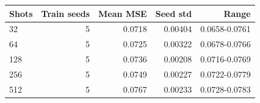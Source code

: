 \begin{tabular}{lrrrr}
\toprule
Shots & Train seeds & Mean MSE & Seed std & Range \\
\midrule
32 & 5 & 0.0718 & 0.00404 & 0.0658-0.0761 \\
64 & 5 & 0.0725 & 0.00322 & 0.0678-0.0766 \\
128 & 5 & 0.0736 & 0.00208 & 0.0716-0.0769 \\
256 & 5 & 0.0749 & 0.00227 & 0.0722-0.0779 \\
512 & 5 & 0.0767 & 0.00233 & 0.0728-0.0783 \\
\bottomrule
\end{tabular}
